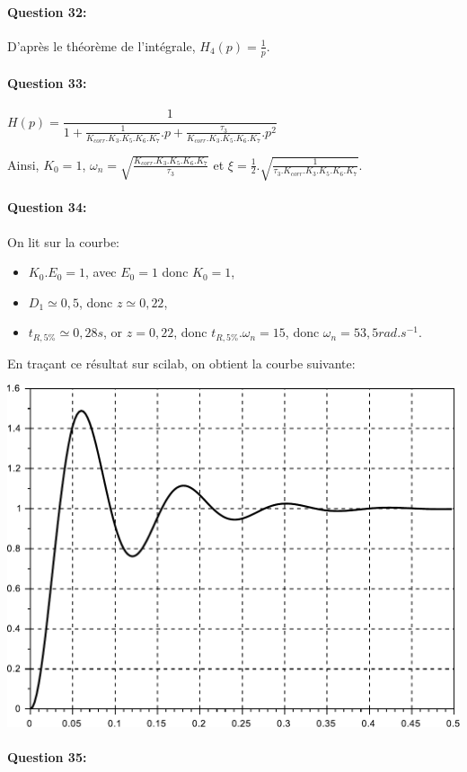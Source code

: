 \paragraph{Question 32:}

D'après le théorème de l'intégrale, $H_4(p)=\frac{1}{p}$.

\paragraph{Question 33:}

$H(p)=\dfrac{1}{1+\frac{1}{K_{corr}.K_3.K_5.K_6.K_7}.p+\frac{\tau_3}{K_{corr}.K_3.K_5.K_6.K_7}.p^2}$

Ainsi, $K_0=1$, $\omega_n=\sqrt{\frac{K_{corr}.K_3.K_5.K_6.K_7}{\tau_3}}$ et $\xi=\frac{1}{2}.\sqrt{\frac{1}{\tau_3.K_{corr}.K_3.K_5.K_6.K_7}}$.

\paragraph{Question 34:}

On lit sur la courbe:
\begin{itemize}
 \item $K_0.E_0=1$, avec $E_0=1$ donc $K_0=1$,
 \item $D_1\simeq0,5$, donc $z\simeq 0,22$,
 \item $t_{R,5\%}\simeq 0,28s$, or $z=0,22$, donc $t_{R,5\%}.\omega_n=15$, donc $\omega_n=53,5rad.s^{-1}$.
\end{itemize}

En traçant ce résultat sur scilab, on obtient la courbe suivante:
\begin{center}
 \includegraphics[width=0.6\linewidth]{img/cor34}
\end{center}

\paragraph{Question 35:}

